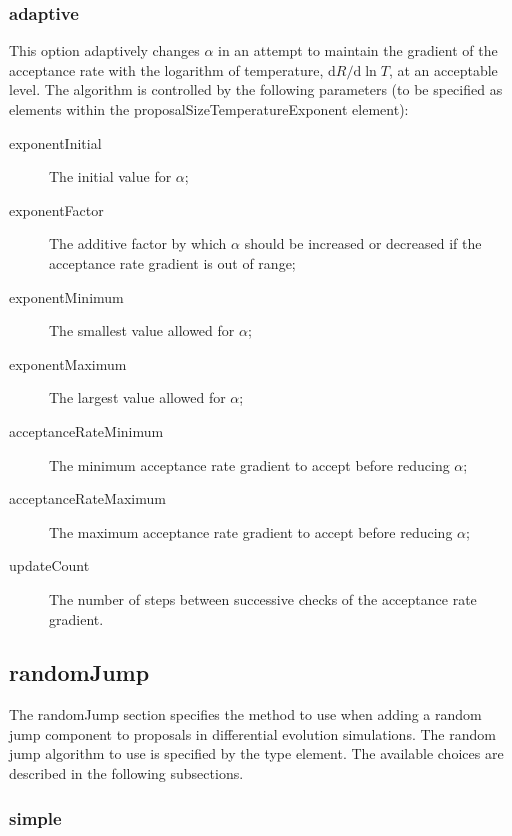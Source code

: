 \subsubsection{{\normalfont \ttfamily adaptive}}

This option adaptively changes $\alpha$ in an attempt to maintain the gradient of the acceptance rate with the logarithm of temperature, ${\mathrm d} R/{\mathrm d}\ln T$, at an acceptable level. The algorithm is controlled by the following parameters (to be specified as elements within the {\normalfont \ttfamily proposalSizeTemperatureExponent} element):
\begin{description}
\item[{\normalfont \ttfamily exponentInitial}] The initial value for $\alpha$;
\item[{\normalfont \ttfamily exponentFactor}] The additive factor by which $\alpha$ should be increased or decreased if the acceptance rate gradient is out of range;
\item[{\normalfont \ttfamily exponentMinimum}] The smallest value allowed for $\alpha$;
\item[{\normalfont \ttfamily exponentMaximum}] The largest value allowed for $\alpha$;
\item[{\normalfont \ttfamily acceptanceRateMinimum}] The minimum acceptance rate gradient to accept before reducing $\alpha$;
\item[{\normalfont \ttfamily acceptanceRateMaximum}] The maximum acceptance rate gradient to accept before reducing $\alpha$;
\item[{\normalfont \ttfamily updateCount}] The number of steps between successive checks of the acceptance rate gradient.
\end{description}


\subsection{{\normalfont \ttfamily randomJump}}

The {\normalfont \ttfamily randomJump} section specifies the method to use when adding a random jump component to proposals in differential evolution simulations. The random jump algorithm to use is specified by the {\normalfont \ttfamily type} element. The available choices are described in the following subsections.

\subsubsection{{\normalfont \ttfamily simple}}

